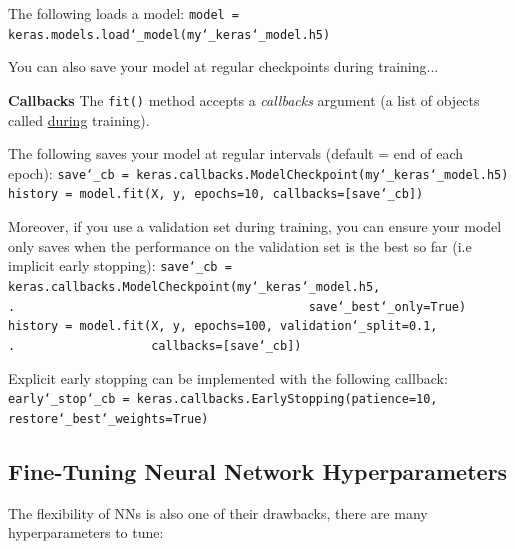 The following loads a model:\newline
\texttt{model = keras.models.load\char`_model(\textquotesingle my\char`_keras\char`_model.h5\textquotesingle)}

You can also save your model at regular checkpoints during training...

\newpage
\textbf{Callbacks}\newline
The \texttt{fit()} method accepts a \textit{callbacks} argument
(a list of objects called \underline{during} training).

The following saves your model at regular intervals (default = end of each epoch):\newline
\texttt{save\char`_cb = keras.callbacks.ModelCheckpoint(\textquotesingle my\char`_keras\char`_model.h5\textquotesingle)}\newline
\texttt{history = model.fit(X, y, epochs=10, callbacks=[save\char`_cb])}

Moreover, if you use a validation set during training,
you can ensure your model only saves when the performance on the validation set is the best so far (i.e implicit early stopping):
\texttt{save\char`_cb = keras.callbacks.ModelCheckpoint(\textquotesingle my\char`_keras\char`_model.h5\textquotesingle,\newline
.~~~~~~~~~~~~~~~~~~~~~~~~~~~~~~~~~~~~~~~~~save\char`_best\char`_only=True)}\newline
\texttt{history = model.fit(X, y, epochs=100, validation\char`_split=0.1,\newline
.~~~~~~~~~~~~~~~~~~~callbacks=[save\char`_cb])}

Explicit early stopping can be implemented with the following callback:\newline
\texttt{early\char`_stop\char`_cb = \newline keras.callbacks.EarlyStopping(patience=10, restore\char`_best\char`_weights=True)}

\subsection{Fine-Tuning Neural Network Hyperparameters}

The flexibility of NNs is also one of their drawbacks,
there are many hyperparameters to tune:

